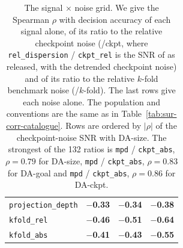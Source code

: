\begin{table}[h]
\begin{tabular}{@{}lrrrrrrrrr@{}}
\texttt{projection\_depth} & \multicolumn{3}{c}{\textbf{$-$0.33}} & \multicolumn{3}{c}{\textbf{$-$0.34}} & \multicolumn{3}{c}{\textbf{$-$0.38}} \\
\texttt{kfold\_rel} & \multicolumn{3}{c}{\textbf{$-$0.46}} & \multicolumn{3}{c}{\textbf{$-$0.51}} & \multicolumn{3}{c}{\textbf{$-$0.64}} \\
\texttt{kfold\_abs} & \multicolumn{3}{c}{\textbf{$-$0.41}} & \multicolumn{3}{c}{\textbf{$-$0.43}} & \multicolumn{3}{c}{\textbf{$-$0.55}} \\
\bottomrule
\end{tabular}
\caption{The signal $\times$ noise grid. We give the Spearman $\rho$ with decision accuracy of each signal alone, of its ratio to the relative checkpoint noise (/ckpt, where \texttt{rel\_dispersion} / \texttt{ckpt\_rel} is the SNR of \citet{heineman_signal_2025} as released, with the detrended checkpoint noise) and of its ratio to the relative $k$-fold benchmark noise (/$k$-fold). The last rows give each noise alone. The population and conventions are the same as in Table~\ref{tab:sur-corr-catalogue}. Rows are ordered by $|\rho|$ of the checkpoint-noise SNR with DA-size. The strongest of the 132 ratios is \texttt{mpd} / \texttt{ckpt\_abs}, $\rho = 0.79$ for DA-size, \texttt{mpd} / \texttt{ckpt\_abs}, $\rho = 0.83$ for DA-goal and \texttt{mpd} / \texttt{ckpt\_abs}, $\rho = 0.86$ for DA-ckpt.}
\label{tab:sur-corr-snr}
\end{table}

